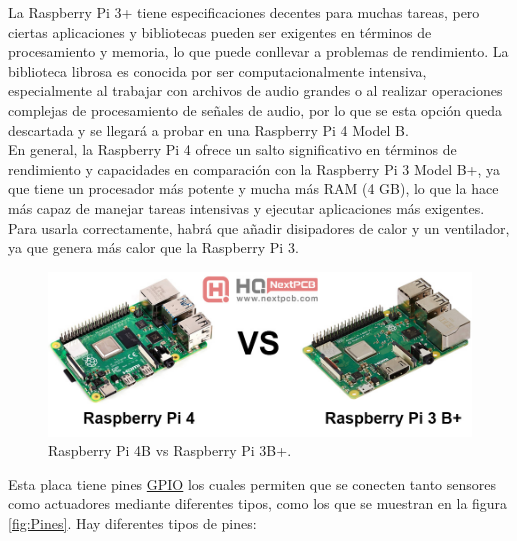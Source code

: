 La Raspberry Pi 3+ tiene especificaciones decentes para muchas tareas, pero ciertas aplicaciones y bibliotecas pueden ser exigentes en términos de procesamiento y memoria, lo que puede conllevar a problemas de rendimiento. La biblioteca librosa es conocida por ser computacionalmente intensiva, especialmente al trabajar con archivos de audio grandes o al realizar operaciones complejas de procesamiento de señales de audio, por lo que se esta opción queda descartada y se llegará a probar en una Raspberry Pi 4 Model B.\\

En general, la Raspberry Pi 4 ofrece un salto significativo en términos de rendimiento y capacidades en comparación con la Raspberry Pi 3 Model B+, ya que tiene un procesador más potente y mucha más RAM (4 GB), lo que la hace más capaz de manejar tareas intensivas y ejecutar aplicaciones más exigentes. Para usarla correctamente, habrá que añadir disipadores de calor y un ventilador, ya que genera más calor que la Raspberry Pi 3.



\begin{figure}[H]
  \centering
  \includegraphics[scale=0.4]{figs/rasps} %
  \caption{Raspberry Pi 4B vs Raspberry Pi 3B+.}
  \label{fig:Raspberry}
\end{figure}


Esta placa tiene pines \hyperlink{GPIO}{GPIO} los cuales permiten que se conecten tanto sensores como actuadores mediante diferentes tipos, como los que se muestran en la figura \ref{fig:Pines}. Hay diferentes tipos de pines:

